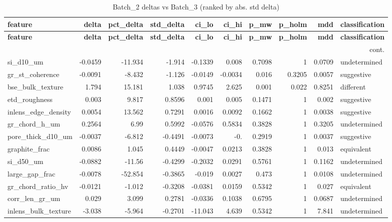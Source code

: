 \documentclass[11pt,a4paper]{article}
\begin{document}
\scriptsize
\begin{longtable}{lrrrrrrrrl}
\caption{Batch\_2 deltas vs Batch\_3 (ranked by abs. std delta)}\label{tab:deltaBatch_2}\\
\toprule
\textbf{feature} & \textbf{delta} & \textbf{pct\_delta} & \textbf{std\_delta} & \textbf{ci\_lo} & \textbf{ci\_hi} & \textbf{p\_mw} & \textbf{p\_holm} & \textbf{mdd} & \textbf{classification} \\
\midrule
\endfirsthead
\toprule \textbf{feature} & \textbf{delta} & \textbf{pct\_delta} & \textbf{std\_delta} & \textbf{ci\_lo} & \textbf{ci\_hi} & \textbf{p\_mw} & \textbf{p\_holm} & \textbf{mdd} & \textbf{classification} \\
\midrule
\endhead
\midrule\multicolumn{10}{r}{\footnotesize cont.}\\\midrule\endfoot
\bottomrule\endlastfoot
si\_d10\_um & -0.0459 & -11.934 & -1.914 & -0.1339 & 0.008 & 0.7098 & 1 & 0.0709 & undetermined \\
gr\_st\_coherence & -0.0091 & -8.432 & -1.126 & -0.0149 & -0.0034 & 0.016 & 0.3205 & 0.0057 & suggestive \\
bse\_bulk\_texture & 1.794 & 15.181 & 1.038 & 0.9745 & 2.625 & 0.001 & 0.022 & 0.8251 & different \\
etd\_roughness & 0.003 & 9.817 & 0.8596 & 0.001 & 0.005 & 0.1471 & 1 & 0.002 & suggestive \\
inlens\_edge\_density & 0.0054 & 13.562 & 0.7291 & 0.0016 & 0.0092 & 0.1662 & 1 & 0.0038 & suggestive \\
gr\_chord\_h\_um & 0.2564 & 6.99 & 0.5992 & -0.0576 & 0.5834 & 0.3828 & 1 & 0.3205 & undetermined \\
pore\_thick\_d10\_um & -0.0037 & -6.812 & -0.4491 & -0.0073 & -0. & 0.2919 & 1 & 0.0037 & suggestive \\
graphite\_frac & 0.0086 & 1.045 & 0.4449 & -0.0047 & 0.0213 & 0.3828 & 1 & 0.013 & equivalent \\
si\_d50\_um & -0.0882 & -11.56 & -0.4299 & -0.2032 & 0.0291 & 0.5761 & 1 & 0.1162 & undetermined \\
large\_gap\_frac & -0.0078 & -52.854 & -0.3865 & -0.019 & 0.0027 & 0.473 & 1 & 0.0108 & undetermined \\
gr\_chord\_ratio\_hv & -0.0121 & -1.012 & -0.3208 & -0.0381 & 0.0159 & 0.5342 & 1 & 0.027 & equivalent \\
corr\_len\_gr\_um & 0.029 & 3.099 & 0.2781 & -0.0336 & 0.1038 & 0.6795 & 1 & 0.0687 & undetermined \\
inlens\_bulk\_texture & -3.038 & -5.964 & -0.2701 & -11.043 & 4.639 & 0.5342 & 1 & 7.841 & undetermined \\

\end{longtable}
\end{document}
